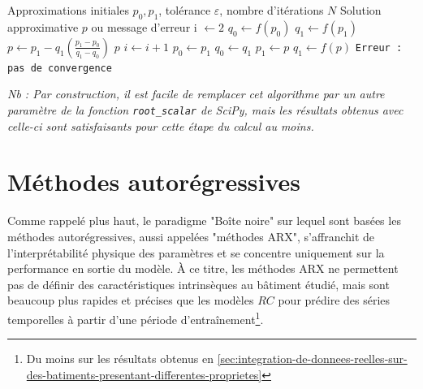         \begin{algorithm}[H]
            \caption{Méthode de la sécante \it{(Tiré de \cite{numerical_analysis_2})}}
            \label{alg:sec}\begin{algorithmic}[1]
                \Require Approximations initiales $p_0, p_1$, tolérance $\varepsilon$,
                nombre d'itérations $N$
                \Ensure Solution approximative $p$ ou message d'erreur
                \State i $\gets 2$
                \State $q_0\gets f\left( p_0 \right)$
                \State $q_1\gets f\left( p_1 \right)$
                    \State $p\gets p_1-q_1\left( \frac{p_1 - p_0}{q_1-q_0} \right)$
                        \State \Return $p$
                    \EndIf
                    \State $i\gets i+1$
                    \State $p_0\gets p_1$
                    \State $q_0\gets q_1$
                    \State $p_1\gets p$
                    \State $q_1\gets f\left( p \right)$
                \EndWhile
                \State \Return \texttt{Erreur : pas de convergence}
            \end{algorithmic}
        \end{algorithm}

        \textit{Nb : Par construction, il est facile de remplacer cet algorithme par un autre paramètre de la fonction \texttt{root\_scalar} de SciPy, mais les résultats obtenus avec celle-ci sont satisfaisants pour cette étape du calcul au moins.}


\newpage

\section{Méthodes autorégressives}\label{sec:methodesautoregressives}

    Comme rappelé plus haut, le paradigme "Boîte noire" sur lequel sont basées les méthodes autorégressives, aussi appelées "méthodes ARX", s'affranchit de l'interprétabilité physique des paramètres
    et se concentre uniquement sur la performance en sortie du modèle.
    À ce titre, les méthodes ARX ne permettent pas de définir des caractéristiques intrinsèques au bâtiment étudié, mais sont beaucoup plus rapides et précises que les modèles $RC$ pour prédire des séries temporelles à partir d'une période d'entraînement\footnote{Du moins sur les résultats obtenus en \ref{sec:integration-de-donnees-reelles-sur-des-batiments-presentant-differentes-proprietes}}.

